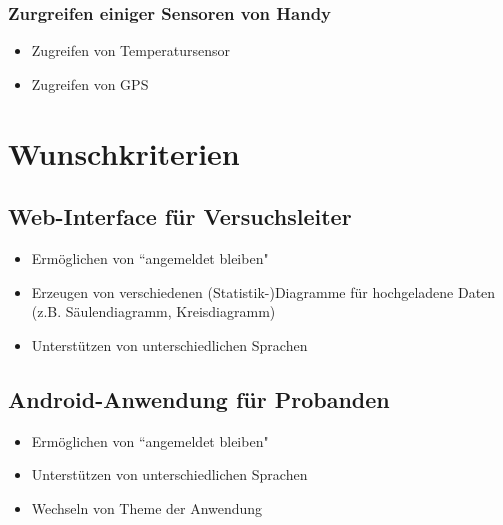 \documentclass[a4paper]{scrreprt}
\begin{document}
                \subsubsection{Zurgreifen einiger Sensoren von Handy}
                    \begin{itemize}
                        \item Zugreifen von Temperatursensor
                        \item Zugreifen von GPS
                    \end{itemize}
                \vspace*{0.5cm}


        \section{Wunschkriterien}
            \vspace*{0.3cm}

            \subsection{Web-Interface f\"ur Versuchsleiter}
                \begin{itemize}
                    \item Erm\"oglichen von ``angemeldet bleiben"
                    \item Erzeugen von verschiedenen (Statistik-)Diagramme f\"ur hochgeladene Daten (z.B. S\"aulendiagramm, Kreisdiagramm)
                    \item Unterst\"utzen von unterschiedlichen Sprachen

                \end{itemize}

            \subsection{Android-Anwendung f\"ur Probanden}
                \begin{itemize}
                    \item Erm\"oglichen von ``angemeldet bleiben"
                    \item Unterst\"utzen von unterschiedlichen Sprachen
                    \item Wechseln von Theme der Anwendung
                \end{itemize}
                \vspace*{0.5cm}
\end{document}
